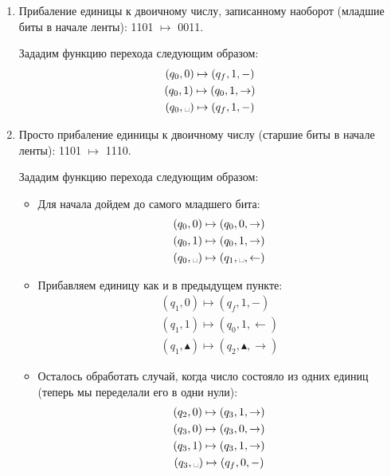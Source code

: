 \begin{example}
    \begin{enumerate}
        \item Прибаление единицы к двоичному числу, записанному наоборот (младшие биты в начале ленты): 1101 $\mapsto$ 0011.
        
        Зададим функцию перехода следующим образом: \begin{gather*}
            (q_0, 0) \mapsto (q_f, 1, -) \\
            (q_0, 1) \mapsto (q_0, 1, \rightarrow) \\
            (q_0, \text{\textvisiblespace)} \mapsto (q_f, 1, -)
        \end{gather*}
        \item Просто прибаление единицы к двоичному числу (старшие биты в начале ленты): 1101 $\mapsto$ 1110.
        
        Зададим функцию перехода следующим образом: \begin{itemize}
            \item Для начала дойдем до самого младшего бита:
            \begin{gather*}
                (q_0, 0) \mapsto (q_0, 0, \rightarrow) \\
                (q_0, 1) \mapsto (q_0, 1, \rightarrow) \\
                (q_0, \text{\textvisiblespace}) \mapsto (q_1, \text{\textvisiblespace}, \leftarrow)
            \end{gather*}
            \item Прибавляем единицу как и в предыдущем пункте:
            \begin{gather*}
                (q_1, 0) \mapsto (q_f, 1, -) \\
                (q_1, 1) \mapsto (q_0, 1, \leftarrow) \\
                (q_1, \blacktriangle) \mapsto (q_2, \blacktriangle, \rightarrow)
            \end{gather*}
            \item Осталось обработать случай, когда число состояло из одних единиц (теперь мы переделали его в одни нули):
            \begin{gather*}
                (q_2, 0) \mapsto (q_3, 1, \rightarrow) \\
                (q_3, 0) \mapsto (q_3, 0, \rightarrow) \\
                (q_3, 1) \mapsto (q_3, 1, \rightarrow) \\
                (q_3, \text{\textvisiblespace}) \mapsto (q_f, 0, -)
            \end{gather*}
        \end{itemize}
    \end{enumerate}
\end{example}

